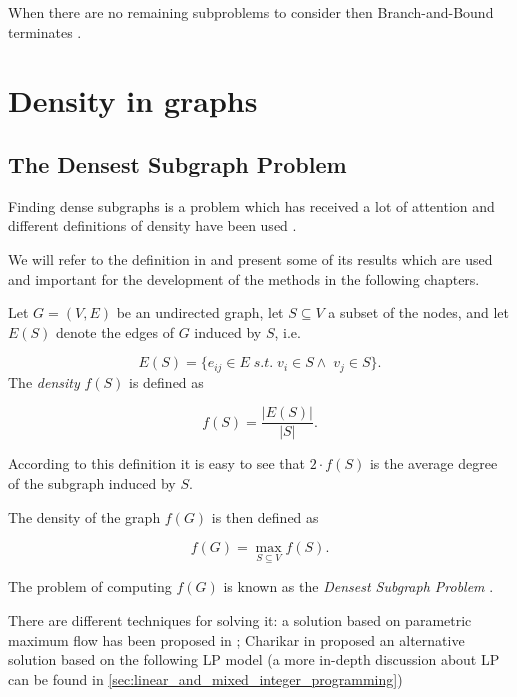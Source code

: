 When there are no remaining subproblems to consider then Branch-and-Bound
terminates \cite{Edgar2001}.

\section{Density in graphs}%
\label{sec:signed_graphs_and_density}

\subsection{The Densest Subgraph Problem}%
\label{sub:densest_subgraphs}

Finding dense subgraphs is a problem which has received a lot of attention and
different definitions of density have been used
\cite{charikar2000greedy,asahiro1995finding,asahiro2000greedily,feige1997densest}.

We will refer to the definition in \cite{charikar2000greedy} and present some
of its results which are used and important for the development of the methods
in the following chapters.

\medskip

Let $G = (V, E)$ be an undirected graph, let $S \subseteq V$ a subset of the
nodes, and let $E(S)$ denote the edges of $G$ induced by $S$, i.e.

\begin{equation*}
	E(S) = \{e_{ij} \in E \; s.t. \; v_i \in S \land \; v_j \in S\}.
\end{equation*}
The \emph{density} $f(S)$ is defined as

\begin{equation}
	f(S) = \frac{|E(S)|}{|S|}.
\end{equation}

According to this definition it is easy to see that $2 \cdot f(S)$ is the
average degree of the subgraph induced by $S$.

The density of the graph $f(G)$ is then defined as

\begin{equation}
	f(G) = \max_{S \subseteq V} {f(S)}.
\end{equation}

The problem of computing $f(G)$ is known as the \emph{Densest Subgraph Problem}
\cite{charikar2000greedy}.

There are different techniques for solving it: a solution based on parametric
maximum flow has been proposed in \cite{Gallo1989}; Charikar in
\cite{charikar2000greedy} proposed an alternative solution based on the
following \acrlong{LP} model (a more in-depth discussion about \acrshort{LP}
can be found in \autoref{sec:linear_and_mixed_integer_programming})

